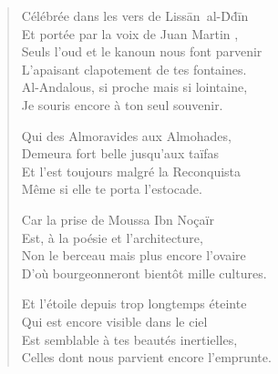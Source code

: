 \begin{verse}\quatrain\sizain
  Célébrée dans les vers de Lissān~al-Ḋḋīn%
  \\  %
  Et portée par la voix de Juan {Martin}%
  ,\\ 
  Seuls l’oud et le kanoun%
  \label{foot.kanoun} nous font parvenir\\ 
  L’apaisant clapotement de tes fontaines.\\ 
  Al-Andalous, si proche mais si lointaine,\\ 
  Je souris encore à ton seul souvenir. %

  Qui des Almoravides aux Almohades,\\ 
  Demeura fort belle jusqu’aux taïfas\\ 
  Et l’est toujours malgré la Reconquista\\ 
  Même si elle te porta l’estocade. %

  Car la prise de  Moussa Ibn Noçaïr%
  \\ 
  Est, à la poésie et l’architecture,\\ 
  Non le berceau mais plus encore l’ovaire\\ 
  D’où bourgeonneront bientôt mille cultures. %

  Et l’étoile depuis trop longtemps éteinte\\ 
  Qui est encore visible dans le ciel\\ 
  Est semblable à tes beautés inertielles,\\ 
  Celles dont nous parvient encore l’emprunte. %


\end{verse}

